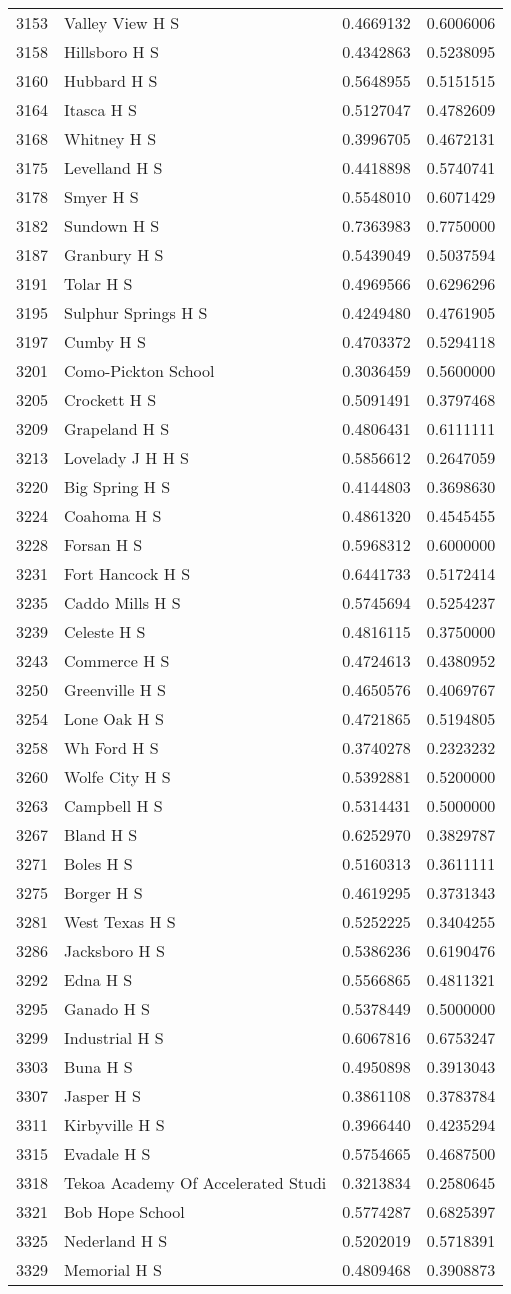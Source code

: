 \documentclass[
]{article}
\begin{document}
\begin{longtable}[]{@{}llrr@{}}
3153 & Valley View H S & 0.4669132 & 0.6006006\tabularnewline
3158 & Hillsboro H S & 0.4342863 & 0.5238095\tabularnewline
3160 & Hubbard H S & 0.5648955 & 0.5151515\tabularnewline
3164 & Itasca H S & 0.5127047 & 0.4782609\tabularnewline
3168 & Whitney H S & 0.3996705 & 0.4672131\tabularnewline
3175 & Levelland H S & 0.4418898 & 0.5740741\tabularnewline
3178 & Smyer H S & 0.5548010 & 0.6071429\tabularnewline
3182 & Sundown H S & 0.7363983 & 0.7750000\tabularnewline
3187 & Granbury H S & 0.5439049 & 0.5037594\tabularnewline
3191 & Tolar H S & 0.4969566 & 0.6296296\tabularnewline
3195 & Sulphur Springs H S & 0.4249480 & 0.4761905\tabularnewline
3197 & Cumby H S & 0.4703372 & 0.5294118\tabularnewline
3201 & Como-Pickton School & 0.3036459 & 0.5600000\tabularnewline
3205 & Crockett H S & 0.5091491 & 0.3797468\tabularnewline
3209 & Grapeland H S & 0.4806431 & 0.6111111\tabularnewline
3213 & Lovelady J H H S & 0.5856612 & 0.2647059\tabularnewline
3220 & Big Spring H S & 0.4144803 & 0.3698630\tabularnewline
3224 & Coahoma H S & 0.4861320 & 0.4545455\tabularnewline
3228 & Forsan H S & 0.5968312 & 0.6000000\tabularnewline
3231 & Fort Hancock H S & 0.6441733 & 0.5172414\tabularnewline
3235 & Caddo Mills H S & 0.5745694 & 0.5254237\tabularnewline
3239 & Celeste H S & 0.4816115 & 0.3750000\tabularnewline
3243 & Commerce H S & 0.4724613 & 0.4380952\tabularnewline
3250 & Greenville H S & 0.4650576 & 0.4069767\tabularnewline
3254 & Lone Oak H S & 0.4721865 & 0.5194805\tabularnewline
3258 & Wh Ford H S & 0.3740278 & 0.2323232\tabularnewline
3260 & Wolfe City H S & 0.5392881 & 0.5200000\tabularnewline
3263 & Campbell H S & 0.5314431 & 0.5000000\tabularnewline
3267 & Bland H S & 0.6252970 & 0.3829787\tabularnewline
3271 & Boles H S & 0.5160313 & 0.3611111\tabularnewline
3275 & Borger H S & 0.4619295 & 0.3731343\tabularnewline
3281 & West Texas H S & 0.5252225 & 0.3404255\tabularnewline
3286 & Jacksboro H S & 0.5386236 & 0.6190476\tabularnewline
3292 & Edna H S & 0.5566865 & 0.4811321\tabularnewline
3295 & Ganado H S & 0.5378449 & 0.5000000\tabularnewline
3299 & Industrial H S & 0.6067816 & 0.6753247\tabularnewline
3303 & Buna H S & 0.4950898 & 0.3913043\tabularnewline
3307 & Jasper H S & 0.3861108 & 0.3783784\tabularnewline
3311 & Kirbyville H S & 0.3966440 & 0.4235294\tabularnewline
3315 & Evadale H S & 0.5754665 & 0.4687500\tabularnewline
3318 & Tekoa Academy Of Accelerated Studi & 0.3213834 &
0.2580645\tabularnewline
3321 & Bob Hope School & 0.5774287 & 0.6825397\tabularnewline
3325 & Nederland H S & 0.5202019 & 0.5718391\tabularnewline
3329 & Memorial H S & 0.4809468 & 0.3908873\tabularnewline

\end{longtable}
\end{document}
